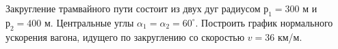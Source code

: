 Закругление трамвайного пути состоит из двух дуг радиусом $р_1=300$ м и
$р_2=400$ м. Центральные углы $\alpha_1=\alpha_2=60^\circ$. Построить
график нормального ускорения вагона, идущего по закруглению со скоростью
$v=36$ км/м.
